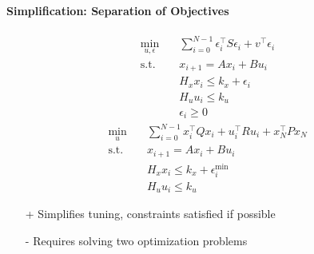 \paragraph{Simplification: Separation of Objectives}
\begin{align*}
    \min_{u, \epsilon} \quad & \sum_{i=0}^{N-1} \epsilon_i^\top S \epsilon_i + v^\top \epsilon_i \\
    \text{s.t.} \quad        & x_{i+1} = A x_i + B u_i                                           \\
                             & H_x x_i \leq k_x + \epsilon_i                                     \\
                             & H_u u_i \leq k_u                                                  \\
                             & \epsilon_i \geq 0
\end{align*}
\newpar{}
\noindent
\begin{align*}
    \min_u \quad      & \sum_{i=0}^{N-1} x_i^\top Q x_i + u_i^\top R u_i + x_N^\top P x_N \\
    \text{s.t.} \quad & x_{i+1} = A x_i + B u_i                                           \\
                      & H_x x_i \leq k_x + \epsilon_i^{\min}                              \\
                      & H_u u_i \leq k_u
\end{align*}

\newpar{}

\begin{itemize}
    \item [+] Simplifies tuning, constraints satisfied if possible
    \item [-] Requires solving two optimization problems
\end{itemize}
